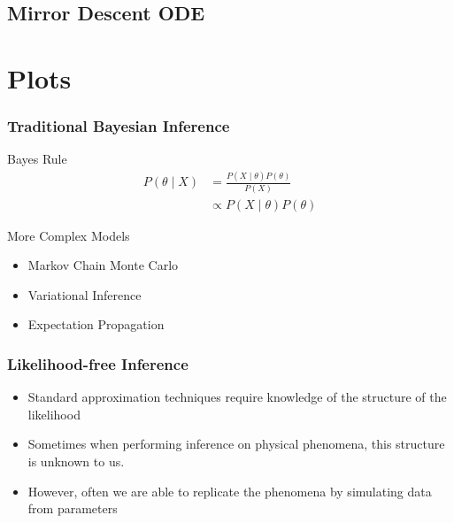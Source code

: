 \documentclass{beamer}
\begin{document}
\subsection{Mirror Descent ODE}

\section{Plots}



\begin{frame}
\frametitle{Traditional Bayesian Inference}
\begin{block}{Bayes Rule}
\begin{align*}
P(\theta \mid X) &= \frac{P(X \mid \theta)P(\theta)}{P(X)} \\
				 &\propto P(X \mid \theta)P(\theta) 
\end{align*}
\end{block}
\pause

\begin{block}{More Complex Models}
\begin{itemize}
\item Markov Chain Monte Carlo
\item Variational Inference
\item Expectation Propagation
\end{itemize}
\end{block}

\end{frame}


\begin{frame}
\frametitle{Likelihood-free Inference}

\begin{itemize}
\item Standard approximation techniques require knowledge of the structure of the likelihood
\pause
\item Sometimes when performing inference on physical phenomena, this structure is unknown to us.
\pause
\item However, often we are able to replicate the phenomena by simulating data from parameters
\end{itemize}
\end{frame}
\end{document}
